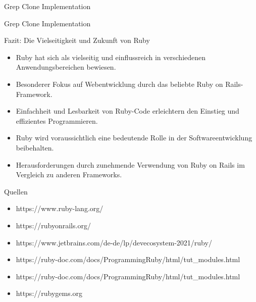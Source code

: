 \documentclass{beamer}
\begin{document}
\begin{frame}{Grep Clone Implementation}

\end{frame}
\begin{frame}{Grep Clone Implementation}

\end{frame}
\begin{frame}{Fazit: Die Vielseitigkeit und Zukunft von Ruby}
  \begin{itemize}
    \item Ruby hat sich als vielseitig und einflussreich in verschiedenen Anwendungsbereichen bewiesen.
 
    \item Besonderer Fokus auf Webentwicklung durch das beliebte Ruby on Rails-Framework.
    \item Einfachheit und Lesbarkeit von Ruby-Code erleichtern den Einstieg und effizientes Programmieren.
    \item Ruby wird voraussichtlich eine bedeutende Rolle in der Softwareentwicklung beibehalten.
    \item Herausforderungen durch zunehmende Verwendung von Ruby on Rails im Vergleich zu anderen Frameworks.
   
  \end{itemize}
\end{frame}
\begin{frame}{Quellen}
  \begin{itemize}
    \item https://www.ruby-lang.org/
    \item https://rubyonrails.org/
    \item https://www.jetbrains.com/de-de/lp/devecosystem-2021/ruby/
    \item https://ruby-doc.com/docs/ProgrammingRuby/html/tut\_modules.html
    \item https://ruby-doc.com/docs/ProgrammingRuby/html/tut\_modules.html
  \item https://rubygems.org
  \end{itemize}
\end{frame}
\end{document}
